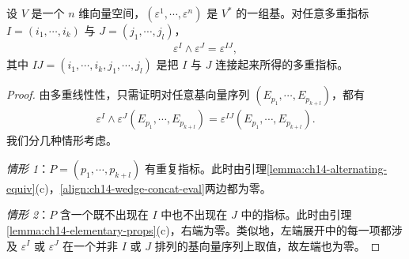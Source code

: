 \documentclass[../../main.tex]{subfiles}
\begin{document}
\begin{lemma}\label{lemma:ch14-wedge-concat}
设 $V$ 是一个 $n$ 维向量空间，$(\varepsilon^1,\cdots ,\varepsilon^n)$ 是 $V^*$ 的一组基。对任意多重指标 $I=(i_1,\cdots ,i_k)$ 与 $J=(j_1,\cdots ,j_l)$，
\begin{align}
\varepsilon^I\wedge\varepsilon^J=\varepsilon^{IJ},\label{align:ch14-wedge-concat}
\end{align}
其中 $IJ=(i_1,\cdots ,i_k,j_1,\cdots ,j_l)$ 是把 $I$ 与 $J$ 连接起来所得的多重指标。
\end{lemma}

\begin{proof}
由多重线性性，只需证明对任意基向量序列 $(E_{p_1},\cdots ,E_{p_{k+l}})$，都有
\begin{align}
\varepsilon^I\wedge\varepsilon^J(E_{p_1},\cdots ,E_{p_{k+l}})
=\varepsilon^{IJ}(E_{p_1},\cdots ,E_{p_{k+l}}).\label{align:ch14-wedge-concat-eval}
\end{align}
我们分几种情形考虑。

\emph{情形 1}：$P=(p_1,\cdots ,p_{k+l})$ 有重复指标。此时由引理\ref{lemma:ch14-alternating-equiv}(c)，\eqref{align:ch14-wedge-concat-eval}两边都为零。

\emph{情形 2}：$P$ 含一个既不出现在 $I$ 中也不出现在 $J$ 中的指标。此时由引理\ref{lemma:ch14-elementary-props}(c)，右端为零。类似地，左端展开中的每一项都涉及 $\varepsilon^I$ 或 $\varepsilon^J$ 在一个并非 $I$ 或 $J$ 排列的基向量序列上取值，故左端也为零。


\end{proof}
\end{document}
